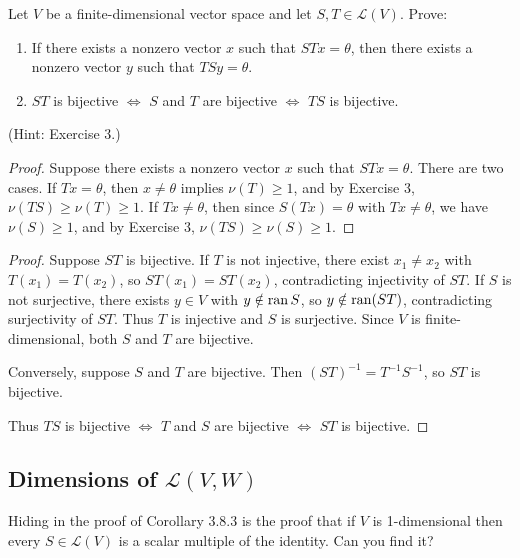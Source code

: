 \begin{tcolorbox}[title=Problem 9, breakable]
    Let $V$ be a finite-dimensional vector space and let $S, T \in \mathcal{L}(V)$. Prove:
    \begin{enumerate}
        \item[(i)] If there exists a nonzero vector $x$ such that $STx = \theta$, then 
        there exists a nonzero vector $y$ such that $TSy = \theta$.
        \item[(ii)] $ST$ is bijective $\Leftrightarrow$ $S$ and $T$ are bijective $\Leftrightarrow$ $TS$ is bijective.
    \end{enumerate}
    (Hint: Exercise 3.)
\end{tcolorbox}

\begin{proof}
    Suppose there exists a nonzero vector $x$ such that $STx = \theta$.
    There are two cases.
    If $Tx = \theta$, then $x \ne \theta$ implies $\nu(T) \ge 1$, and by Exercise 3, 
    $\nu(TS) \ge \nu(T) \ge 1$.
    If $Tx \ne \theta$, then since $S(Tx) = \theta$ with $Tx \ne \theta$, 
    we have $\nu(S) \ge 1$, and by Exercise 3, $\nu(TS) \ge \nu(S) \ge 1$.
\end{proof}

\begin{proof}
    Suppose $ST$ is bijective.
    If $T$ is not injective, there exist $x_1 \ne x_2$ with $T(x_1) = T(x_2)$,
    so $ST(x_1) = ST(x_2)$, contradicting injectivity of $ST$.
    If $S$ is not surjective, there exists $y \in V$ with $y \notin \operatorname{ran} S$,
    so $y \notin \operatorname{ran}(ST)$, contradicting surjectivity of $ST$.
    Thus $T$ is injective and $S$ is surjective. Since $V$ is finite-dimensional,
    both $S$ and $T$ are bijective.

    Conversely, suppose $S$ and $T$ are bijective. Then $(ST)^{-1} = T^{-1}S^{-1}$,
    so $ST$ is bijective.

    Thus $TS$ is bijective $\Leftrightarrow$ $T$ and $S$ are bijective $\Leftrightarrow$ $ST$ is bijective.
\end{proof}

\subsection{Dimensions of $\mathcal{L}(V, W)$}

\begin{tcolorbox}[title=Exercise 1, breakable]
    Hiding in the proof of Corollary 3.8.3 is the proof that if $V$ is 
    1-dimensional then every $S \in \mathcal{L}(V)$ is a scalar multiple of the identity.
    Can you find it?
\end{tcolorbox}

